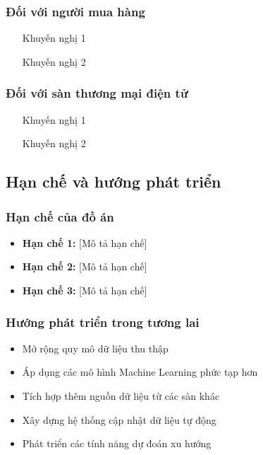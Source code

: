 \subsubsection{Đối với người mua hàng}
\begin{itemize}
    \item [Khuyến nghị 1]
    \item [Khuyến nghị 2]
\end{itemize}

\subsubsection{Đối với sàn thương mại điện tử}
\begin{itemize}
    \item [Khuyến nghị 1]
    \item [Khuyến nghị 2]
\end{itemize}

\subsection{Hạn chế và hướng phát triển}

\subsubsection{Hạn chế của đồ án}
\begin{itemize}
    \item \textbf{Hạn chế 1:} [Mô tả hạn chế]
    \item \textbf{Hạn chế 2:} [Mô tả hạn chế]
    \item \textbf{Hạn chế 3:} [Mô tả hạn chế]
\end{itemize}

\subsubsection{Hướng phát triển trong tương lai}
\begin{itemize}
    \item Mở rộng quy mô dữ liệu thu thập
    \item Áp dụng các mô hình Machine Learning phức tạp hơn
    \item Tích hợp thêm nguồn dữ liệu từ các sàn khác
    \item Xây dựng hệ thống cập nhật dữ liệu tự động
    \item Phát triển các tính năng dự đoán xu hướng
\end{itemize}

